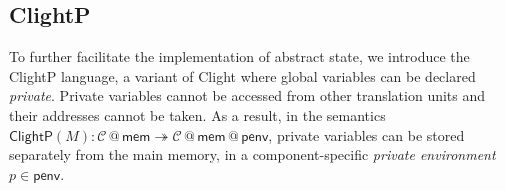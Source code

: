 \documentclass[acmsmall,screen,review,anonymous]{acmart}
\newcommand{\kw}[1]{\ensuremath{ \mathsf{#1} }}
\begin{document}

\subsection{ClightP} %

To further facilitate the implementation of abstract state,
we introduce the ClightP language,
a variant of Clight
where global variables can be declared \emph{private}.
Private variables cannot be accessed
from other translation units and
their addresses cannot be taken.
As a result, in the semantics
$
  \kw{ClightP}(M) :
    \mathcal{C} \mathbin@ \kw{mem}
    \twoheadrightarrow
    \mathcal{C} \mathbin@ \kw{mem} \mathbin@ \kw{penv}
$,
private variables can be stored
separately from the main memory,
in a component-specific
\emph{private environment} $p \in \kw{penv}$.
\end{document}
